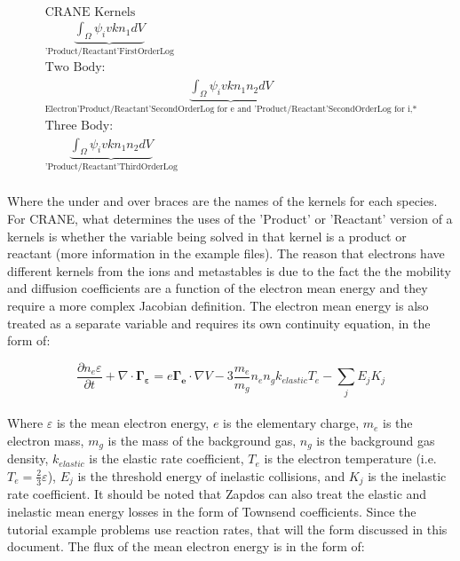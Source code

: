 \documentclass[final]{report}
\begin{document}
  \begin{equation}
    \begin{gathered}
    \text{CRANE Kernels} \\
    \underbrace{\int_{\Omega}\psi_{i}vkn_{1} dV}_\text{'Product/Reactant'FirstOrderLog} \\
    \text{Two Body:} \\
    \underbrace{\int_{\Omega}\psi_{i}vkn_{1}n_{2} dV}_\text{Electron'Product/Reactant'SecondOrderLog for e and 'Product/Reactant'SecondOrderLog for i,*} \\
    \text{Three Body:} \\
    \underbrace{\int_{\Omega}\psi_{i}vkn_{1}n_{2} dV}_\text{'Product/Reactant'ThirdOrderLog}
    \end{gathered}
  \end{equation}
  \\
  Where the under and over braces are the names of the kernels for each species. For CRANE, what determines the uses of the 'Product' or 'Reactant' version of a kernels is whether the variable being solved in that kernel is a product or reactant (more information in the example files).  The reason that electrons have different kernels from the ions and metastables is due to the fact the the mobility and diffusion coefficients are a function of the electron mean energy and they require a more complex Jacobian definition. The electron mean energy is also treated as a separate variable and requires its own continuity equation, in the form of:

  \begin{equation}
      \frac{\partial n_{e}\varepsilon}{\partial t}+\nabla\cdot\mathbf{\Gamma_{\varepsilon}}=e\mathbf{\Gamma_{e}}\cdot\nabla V-3\frac{m_{e}}{m_{g}}n_{e}n_{g}k_{elastic}T_{e}-\sum_{j}{E_jK_j}
  \end{equation}
  \\
  Where $\varepsilon$ is the mean electron energy, $e$ is the elementary charge, $m_{e}$ is the electron mass, $m_{g}$ is the mass of the background gas, $n_{g}$ is the background gas density, $k_{elastic}$ is the elastic rate coefficient, $T_{e}$ is the electron temperature (i.e. $T_{e}=\frac{2}{3}\varepsilon$), $E_{j}$ is the threshold energy of inelastic collisions, and $K_{j}$ is the inelastic rate coefficient. It should be noted that Zapdos can also treat the elastic and inelastic mean energy losses in the form of Townsend coefficients. Since the tutorial example problems use reaction rates, that will the form discussed in this document. The flux of the mean electron energy is in the form of:
\end{document}
